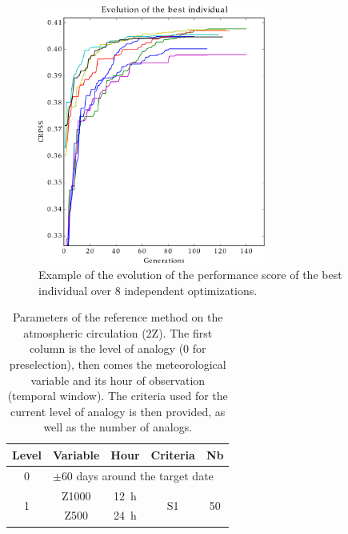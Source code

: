 \documentclass[review]{elsarticle}
\begin{document}
\begin{figure}[t]
	\centerline{\includegraphics[width=7.5cm]{figures/fig17.pdf}}
	\caption{Example of the evolution of the performance score of the best individual over 8 independent optimizations.}
	\label{fig:evolution}
\end{figure}

\clearpage


\begin{table}[t]
	\caption{Parameters of the reference method on the atmospheric circulation (2Z). The first column is the level of analogy (0 for preselection), then comes the meteorological variable and its hour of observation (temporal window). The criteria used for the current level of analogy is then provided, as well as the number of analogs.}
	\footnotesize
	\begin{center}
		\begin{tabular}{ccccc}
			\hline
			Level & Variable & Hour & Criteria & Nb \\ 
			\hline 
			0 & \multicolumn{4}{l}{$\pm 60$ days around the target date} \\
			\hline 
			\multirow{2}{*}{1} & Z1000 & 12~h & \multirow{2}{*}{S1} & \multirow{2}{*}{50} \\
			& Z500 & 24~h & & \\ 
			\hline 
		\end{tabular} 
	\end{center}
	\label{table:params_R1}
\end{table}
\end{document}
